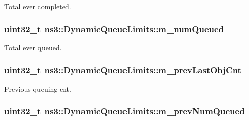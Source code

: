 Total ever completed. 

\subsubsection[{\texorpdfstring{m\+\_\+num\+Queued}{m_numQueued}}]{\setlength{\rightskip}{0pt plus 5cm}uint32\+\_\+t ns3\+::\+Dynamic\+Queue\+Limits\+::m\+\_\+num\+Queued\hspace{0.3cm}{\ttfamily [private]}}\hypertarget{classns3_1_1DynamicQueueLimits_a5ac74a84c50fccf99c9580d21554146b}{}\label{classns3_1_1DynamicQueueLimits_a5ac74a84c50fccf99c9580d21554146b}


Total ever queued. 

\subsubsection[{\texorpdfstring{m\+\_\+prev\+Last\+Obj\+Cnt}{m_prevLastObjCnt}}]{\setlength{\rightskip}{0pt plus 5cm}uint32\+\_\+t ns3\+::\+Dynamic\+Queue\+Limits\+::m\+\_\+prev\+Last\+Obj\+Cnt\hspace{0.3cm}{\ttfamily [private]}}\hypertarget{classns3_1_1DynamicQueueLimits_aa0575ebe24da604189c82e32df9882e3}{}\label{classns3_1_1DynamicQueueLimits_aa0575ebe24da604189c82e32df9882e3}


Previous queuing cnt. 

\subsubsection[{\texorpdfstring{m\+\_\+prev\+Num\+Queued}{m_prevNumQueued}}]{\setlength{\rightskip}{0pt plus 5cm}uint32\+\_\+t ns3\+::\+Dynamic\+Queue\+Limits\+::m\+\_\+prev\+Num\+Queued\hspace{0.3cm}{\ttfamily [private]}}\hypertarget{classns3_1_1DynamicQueueLimits_a88d80e7cd24b67993d9416ff0c7fd75d}{}\label{classns3_1_1DynamicQueueLimits_a88d80e7cd24b67993d9416ff0c7fd75d}


